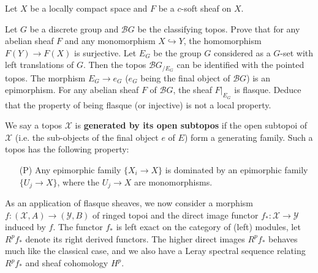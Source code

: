 \begin{example}
Let $X$ be a locally compact space and $F$ be a $c$-soft sheaf on $X$. 
\end{example}

\begin{example}
Let $G$ be a discrete group and $\mathcal{B}G$ be the classifying topos. Prove that for any abelian sheaf $F$ and any monomorphism $X\hookrightarrow Y$, the homomorphism $F(Y)\to F(X)$ is surjective. Let $E_G$ be the group $G$ considered as a $G$-set with left translations of $G$. Then the topos $\mathcal{B}G_{/E_G}$ can be identified with the pointed topos. The morphism $E_G\to e_G$ ($e_G$ being the final object of $\mathcal{B}G$) is an epimorphism. For any abelian sheaf $F$ of $\mathcal{B}G$, the sheaf $F|_{E_G}$ is flasque. Deduce that the property of being flasque (or injective) is not a local property.
\end{example}

\begin{example}
We say a topos $\mathcal{X}$ is \textbf{generated by its open subtopos} if the open subtopoi of $\mathcal{X}$ (i.e. the sub-objects of the final object $e$ of $E$) form a generating family. Such a topos has the following property:
\begin{enumerate}
\item[(P)] Any epimorphic family $\{X_i\to X\}$ is dominated by an epimorphic family $\{U_j\to X\}$, where the $U_j\to X$ are monomorphisms.
\end{enumerate}
\end{example}

As an application of flasque sheaves, we now consider a morphism $f:(\mathcal{X},A)\to (\mathcal{Y},B)$ of ringed topoi and the direct image functor $f_*:\mathcal{X}\to \mathcal{Y}$ induced by $f$. The functor $f_*$ is left exact on the category of (left) modules, let $R^pf_*$ denote its right derived functors. The higher direct images $R^pf_*$ behaves much like the classical case, and we also have a Leray spectral sequence relating $R^pf_*$ and sheaf cohomology $H^p$.

